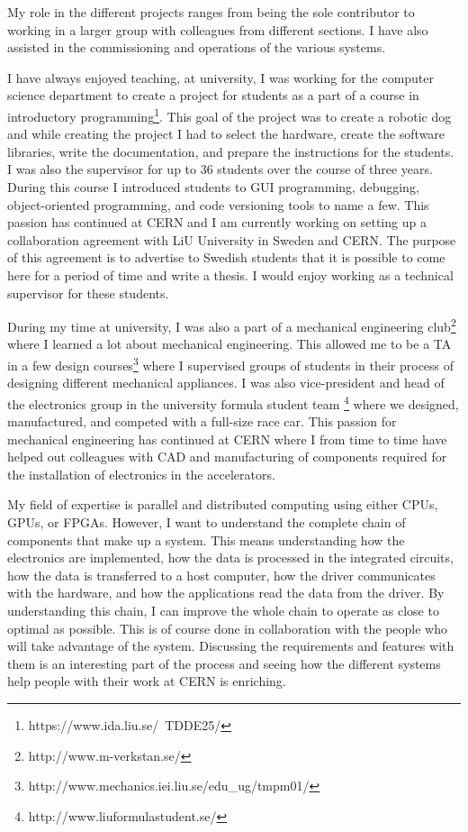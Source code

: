 \documentclass[left=2.5cm,top=2cm,right=2.5cm,bottom=2.5cm]{cv-style}
\begin{document}
My role in the different projects ranges from being the sole contributor to working in a larger group with colleagues from different sections. I have also assisted in the commissioning and operations of the various systems.

I have always enjoyed teaching, at university, I was working for the computer science department to create a project for students as a part of a course in introductory programming\footnote{https://www.ida.liu.se/~TDDE25/}. This goal of the project was to create a robotic dog and while creating the project I had to select the hardware, create the software libraries, write the documentation, and prepare the instructions for the students. I was also the supervisor for up to 36 students over the course of three years. During this course I introduced students to GUI programming, debugging, object-oriented programming, and code versioning tools to name a few. This passion has continued at CERN and I am currently working on setting up a collaboration agreement with LiU University in Sweden and CERN. The purpose of this agreement is to advertise to Swedish students that it is possible to come here for a period of time and write a thesis. I would enjoy working as a technical supervisor for these students.

During my time at university, I was also a part of a mechanical engineering club\footnote{http://www.m-verkstan.se/} where I learned a lot about mechanical engineering. This allowed me to be a TA in a few design courses\footnote{http://www.mechanics.iei.liu.se/edu\_ug/tmpm01/} where I supervised groups of students in their process of designing different mechanical appliances. I was also vice-president and head of the electronics group in the university formula student team \footnote{http://www.liuformulastudent.se/} where we designed, manufactured, and competed with a full-size race car. This passion for mechanical engineering has continued at CERN where I from time to time have helped out colleagues with CAD and manufacturing of components required for the installation of electronics in the accelerators. 

My field of expertise is parallel and distributed computing using either CPUs, GPUs, or FPGAs. However, I want to understand the complete chain of components that make up a system. This means understanding how the electronics are implemented, how the data is processed in the integrated circuits, how the data is transferred to a host computer, how the driver communicates with the hardware, and how the applications read the data from the driver. By understanding this chain, I can improve the whole chain to operate as close to optimal as possible. This is of course done in collaboration with the people who will take advantage of the system. Discussing the requirements and features with them is an interesting part of the process and seeing how the different systems help people with their work at CERN is enriching. 
\end{document}
